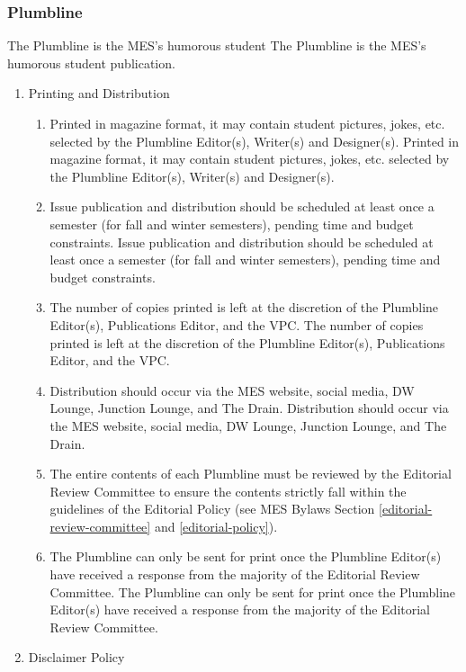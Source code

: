 \subsubsection{Plumbline}
\label{plumbline}
The Plumbline is the MES's humorous student
The Plumbline is the MES's humorous student
publication.

\begin{enumerate}
 \item
  Printing and Distribution

  \begin{enumerate}
   \item
    Printed in magazine format, it may contain student pictures, jokes, etc. selected by the Plumbline Editor(s), Writer(s) and Designer(s).
    Printed in magazine format, it may contain student pictures, jokes, etc. selected by the Plumbline Editor(s), Writer(s) and Designer(s).
   \item
    Issue publication and distribution should be scheduled at least once a semester (for fall and winter semesters), pending time and budget constraints.
    Issue publication and distribution should be scheduled at least once a semester (for fall and winter semesters), pending time and budget constraints.
   \item
    The number of copies printed is left at the discretion of the Plumbline Editor(s), Publications Editor, and the VPC. 
    The number of copies printed is left at the discretion of the Plumbline Editor(s), Publications Editor, and the VPC. 
   \item
    Distribution should occur via the MES website, social media, DW Lounge, Junction Lounge, and The Drain. 
    Distribution should occur via the MES website, social media, DW Lounge, Junction Lounge, and The Drain. 
   \item
    The entire contents of each Plumbline must be reviewed by the Editorial Review Committee to ensure the contents strictly fall within the guidelines of the Editorial Policy (see MES Bylaws Section \ref{editorial-review-committee} and \ref{editorial-policy}). %
   \item
    The Plumbline can only be sent for print once the Plumbline Editor(s) have received a response from the majority of the Editorial Review Committee.
    The Plumbline can only be sent for print once the Plumbline Editor(s) have received a response from the majority of the Editorial Review Committee.
  \end{enumerate}
 \item
  Disclaimer Policy


\end{enumerate}
